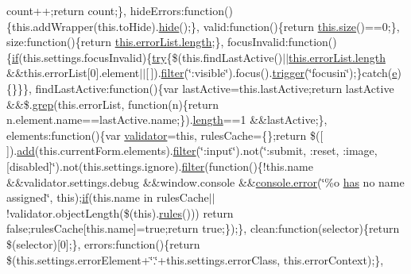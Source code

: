 \begin{DoxyCompactItemize}
count++;return count;\}, hide\+Errors\+:function()\{this.\+add\+Wrapper(this.\+to\+Hide).\hyperlink{jquery-1_810_82-vsdoc_8js_ab184a969b4c8542290dae744d90fd4d2}{hide}();\}, valid\+:function()\{return \hyperlink{packages_2j_query_81_810_82_2_content_2_scripts_2jquery-1_810_82_8js_afa6806c6ee5e63d5177f1dcc082ba6bc}{this.\+size}()==0;\}, size\+:function()\{return \hyperlink{jquery-1_810_82-vsdoc_8js_aa7de35d58da66d9944ab9cbe82c19640}{this.\+error\+List.\+length};\}, focus\+Invalid\+:function()\{\hyperlink{packages_2_respond_81_82_80_2content_2_scripts_2respond_8min_8js_a93851d60dd037a83509a1757b9ee7b66}{if}(this.\+settings.\+focus\+Invalid)\{\hyperlink{packages_2j_query_81_810_82_2_content_2_scripts_2jquery-1_810_82_8js_abe4cc9788f52e49485473dc699537388}{try}\{\$(this.\+find\+Last\+Active()$\vert$$\vert$\hyperlink{jquery-1_810_82-vsdoc_8js_aa7de35d58da66d9944ab9cbe82c19640}{this.\+error\+List.\+length} \&\&this.\+error\+List\mbox{[}0\mbox{]}.element$\vert$$\vert$\mbox{[}$\,$\mbox{]}).\hyperlink{jquery-1_810_82-vsdoc_8js_ac99d0cf56cab46114f5765a14e03ad6d}{filter}(\char`\"{}\+:visible\char`\"{}).focus().\hyperlink{jquery-1_810_82-vsdoc_8js_a2388c4114d5e3e4eab020f973641519c}{trigger}(\char`\"{}focusin\char`\"{});\}catch(\hyperlink{packages_2_respond_81_82_80_2content_2_scripts_2respond_8min_8js_a2c038346d47955cbe2cb91e338edd7e1}{e})\{\}\}\}, find\+Last\+Active\+:function()\{var last\+Active=this.\+last\+Active;return last\+Active \&\&\$.\hyperlink{jquery-1_810_82-vsdoc_8js_ae68047c53cf0b4906eb8f3256d860435}{grep}(this.\+error\+List, function(n)\{return n.\+element.\+name==last\+Active.\+name;\}).\hyperlink{jquery-1_810_82-vsdoc_8js_aa7de35d58da66d9944ab9cbe82c19640}{length}==1 \&\&last\+Active;\}, elements\+:function()\{var \hyperlink{packages_2j_query_8_validation_81_811_81_2_content_2_scripts_2jquery_8validate_8js_a2dc8272bb221cdffcccbd20db038f172}{validator}=this, rules\+Cache=\{\};return \$(\mbox{[}$\,$\mbox{]}).\hyperlink{jquery-1_810_82-vsdoc_8js_a2f34e089948aad779d5a43c9b381caa6}{add}(this.\+current\+Form.\+elements).\hyperlink{jquery-1_810_82-vsdoc_8js_ac99d0cf56cab46114f5765a14e03ad6d}{filter}(\char`\"{}\+:input\char`\"{}).not(\char`\"{}\+:submit, \+:reset, \+:image, \mbox{[}disabled\mbox{]}\char`\"{}).not(this.\+settings.\+ignore).\hyperlink{jquery-1_810_82-vsdoc_8js_ac99d0cf56cab46114f5765a14e03ad6d}{filter}(function()\{!this.\+name \&\&validator.\+settings.\+debug \&\&window.\+console \&\&\hyperlink{jquery-1_810_82-vsdoc_8js_acd25716dc66c2c57df2fc97807ffbddf}{console.\+error}(\char`\"{}\%o \hyperlink{jquery-1_810_82-vsdoc_8js_a3976525435f2cc0ddbdfd1fd4fa719ec}{has} no name assigned\char`\"{}, this);\hyperlink{packages_2_respond_81_82_80_2content_2_scripts_2respond_8min_8js_a93851d60dd037a83509a1757b9ee7b66}{if}(this.\+name in rules\+Cache$\vert$$\vert$!validator.\+object\+Length(\$(this).\hyperlink{packages_2_respond_81_82_80_2content_2_scripts_2respond_8js_ada87c2e257bc5ff6e77cdbc23ed986a3}{rules}())) return false;rules\+Cache\mbox{[}this.\+name\mbox{]}=true;return true;\});\}, clean\+:function(selector)\{return \$(selector)\mbox{[}0\mbox{]};\}, errors\+:function()\{return \$(this.\+settings.\+error\+Element+\char`\"{}.\char`\"{}+this.\+settings.\+error\+Class, this.\+error\+Context);\}, 
\end{DoxyCompactItemize}
